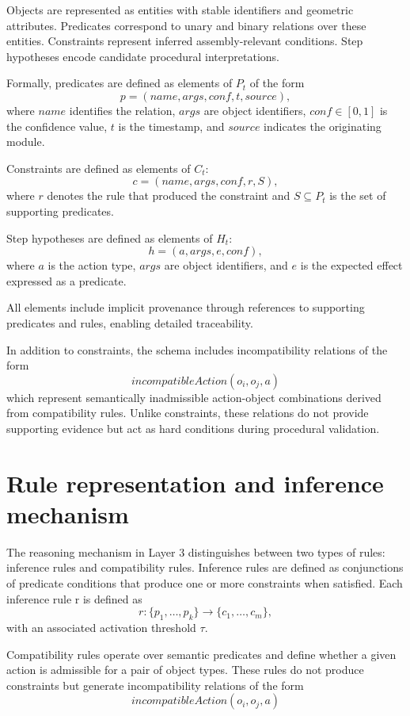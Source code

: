 \documentclass[11pt,titlepage,openright]{book}
\begin{document}
Objects are represented as entities with stable identifiers and geometric attributes. Predicates correspond to unary and binary relations over these entities. Constraints represent inferred assembly-relevant conditions. Step hypotheses encode candidate procedural interpretations.

Formally, predicates are defined as elements of $P_t$ of the form
\[
p = (name, args, conf, t, source),
\]
where $name$ identifies the relation, $args$ are object identifiers, $conf \in [0,1]$ is the confidence value, $t$ is the timestamp, and $source$ indicates the originating module.

Constraints are defined as elements of $C_t$:
\[
c = (name, args, conf, r, S),
\]
where $r$ denotes the rule that produced the constraint and $S \subseteq P_t$ is the set of supporting predicates.

Step hypotheses are defined as elements of $H_t$:
\[
h = (a, args, e, conf),
\]
where $a$ is the action type, $args$ are object identifiers, and $e$ is the expected effect expressed as a predicate.

All elements include implicit provenance through references to supporting predicates and rules, enabling detailed traceability.

In addition to constraints, the schema includes incompatibility relations of the form 
\[
incompatibleAction(o_i, o_j, a)
\]
which represent semantically inadmissible action-object combinations derived from compatibility rules. Unlike constraints, these relations do not provide supporting evidence but act as hard conditions during procedural validation.


\section{Rule representation and inference mechanism}

The reasoning mechanism in Layer 3 distinguishes between two types of rules: inference rules and
compatibility rules. Inference rules are defined as conjunctions of predicate conditions that produce one or
more constraints when satisfied. Each inference rule r is defined as
\[
r: \{p_1, \dots, p_k\} \rightarrow \{c_1, \dots, c_m\},
\]
with an associated activation threshold $\tau$.

Compatibility rules operate over semantic predicates and define whether a given action is admissible for a pair of object types. These rules do not produce constraints but generate incompatibility relations of the form 
\[
incompatibleAction(o_i, o_j, a)
\]
\end{document}

